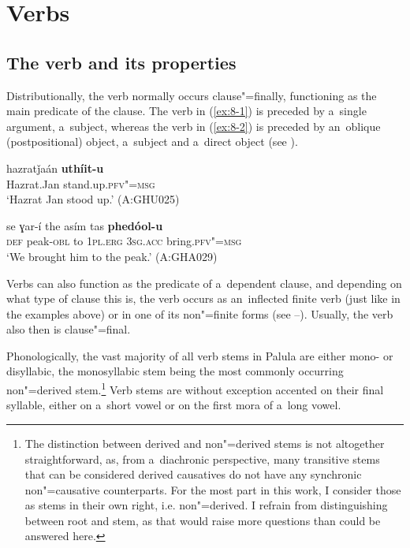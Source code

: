 \chapter{Verbs}
\label{chap:8}

\section{The verb and its properties}
\label{sec:8-1}



Distributionally, the verb normally occurs clause"=finally, functioning as the main predicate of the clause. The verb in (\ref{ex:8-1}) is preceded by a~single argument, a~subject, whereas the verb in (\ref{ex:8-2}) is preceded by an~oblique (postpositional) object, a~subject and a~direct object (see ).

\begin{exe}
\ex
\label{ex:8-1}
\gll hazratǰaán \textbf{uthíit-u} \\
Hazrat.Jan stand.up.\textsc{pfv"=msg} \\
\glt `Hazrat Jan stood up.' (A:GHU025)
\end{exe}
\begin{exe}
\ex
\label{ex:8-2}
\gll se ɣar-í the asím tas \textbf{phedóol-u} \\
\textsc{def} peak-\textsc{obl} to \textsc{1pl.erg} \textsc{3sg.acc} bring.\textsc{pfv"=msg} \\
\glt `We brought him to the peak.' (A:GHA029)
\end{exe}

Verbs can also function as the predicate of a~dependent clause, and depending on what type of clause this is, the verb occurs as an~inflected finite verb (just like in the examples above) or in one of its non"=finite forms (see --). Usually, the verb also then is clause"=final.


Phonologically, the vast majority of all verb stems in Palula are either mono- or disyllabic, the monosyllabic stem being the most commonly occurring non"=derived stem.\footnote{The distinction between derived and non"=derived stems is not altogether straightforward, as, from a~diachronic perspective, many transitive stems that can be considered derived causatives do not have any synchronic non"=causative counterparts. For the most part in this work, I consider those as stems in their own right, i.e. non"=derived. I refrain from distinguishing between root and stem, as that would raise more questions than could be answered here.} Verb stems are without exception accented on their final syllable, either on a~short vowel or on the first mora of a~long vowel. 


